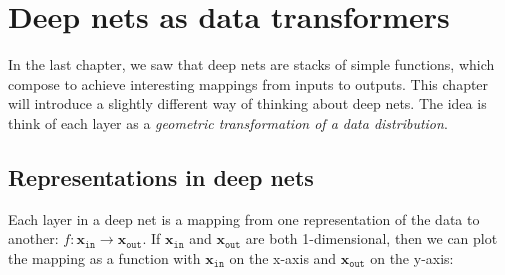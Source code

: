 \usetikzlibrary{arrows,arrows.spaced,decorations.markings}

\usetikzlibrary{plotmarks}
\usetikzlibrary{arrows.meta}

\newcommand{\xin}{\mathbf{x}_{\texttt{in}}}
\newcommand{\xout}{\mathbf{x}_{\texttt{out}}}
\newcommand{\xini}{x_{\texttt{in}_i}}
\newcommand{\xouti}{x_{\texttt{out}_i}}
\newcommand{\xink}{x_{\texttt{in}_k}}
\newcommand{\pdata}{p_{\texttt{data}}}
\newcommand{\pin}{p_{\texttt{in}}}
\newcommand{\pout}{p_{\texttt{out}}}




\setcounter{chapter}{9}
\chapter{Deep nets as data transformers}

In the last chapter, we saw that deep nets are stacks of simple functions, which compose to achieve interesting mappings from inputs to outputs. This chapter will introduce a slightly different way of thinking about deep nets. The idea is think of each layer as a \emph{geometric transformation of a data distribution}.

\section{Representations in deep nets}

Each layer in a deep net is a mapping from one representation of the data to another: $f: \xin \rightarrow \xout$. If $\xin$ and $\xout$ are both 1-dimensional, then we can plot the mapping as a function with $\xin$ on the x-axis and $\xout$ on the y-axis:

